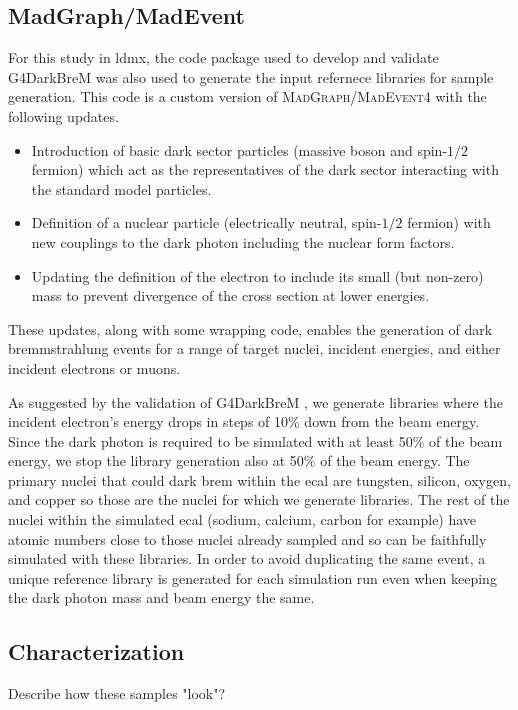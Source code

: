 \subsection{MadGraph/MadEvent}
For this study in \ac{ldmx}, the code package used to develop and validate G4DarkBreM
was also used to generate the input refernece libraries for sample generation.
This code is a custom version of \textsc{MadGraph/MadEvent4} with the following updates.
\begin{itemize}
	\item Introduction of basic dark sector particles
	(massive boson and spin-$1/2$ fermion) which act as the representatives of
	the dark sector interacting with the standard model particles.
	\item Definition of a nuclear particle (electrically neutral, spin-$1/2$ fermion)
	with new couplings to the dark photon including the nuclear form factors.
	\item Updating the definition of the electron to include its small (but non-zero)
	mass to prevent divergence of the cross section at lower energies.
\end{itemize}
These updates, along with some wrapping code, enables the generation of
dark bremmstrahlung events for a range of target nuclei, incident energies,
and either incident electrons or muons.

As suggested by the validation of G4DarkBreM \cite{g4darkbrem},
we generate libraries where the incident electron's energy drops in steps of 10\%
down from the beam energy.
Since the dark photon is required to be simulated with at least 50\% of the beam energy, 
we stop the library generation also at 50\% of the beam energy.
The primary nuclei that could dark brem within the \ac{ecal} are tungsten, silicon, 
oxygen, and copper so those are the nuclei for which we generate libraries.
The rest of the nuclei within the simulated \ac{ecal} (sodium, calcium, carbon
for example) have atomic numbers close to those nuclei already sampled
and so can be faithfully simulated with these libraries.
In order to avoid duplicating the same event, a unique reference library is generated
for each simulation run even when keeping the dark photon mass and beam energy the same.

\subsection{Characterization}
Describe how these samples "look"?

